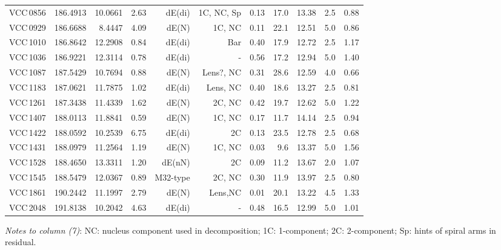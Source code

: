 \documentclass[useAMS,usenatbib]{mn2e}
\begin{document}
\begin{table*}
\begin{threeparttable}
\begin{tabular}{|r|r|r|r|r|r|r|r|r|r|r|}
VCC\,0856 &186.4913 & 10.0661 & 2.63  &dE(di)	  	&1C, NC, Sp	&0.13	&17.0	&13.38	&2.5& 0.88 	\\
VCC\,0929 &186.6688 & 8.4447  & 4.09  &dE(N)    	&1C, NC		&0.11	&22.1	&12.51	&5.0& 0.86 	\\
VCC\,1010 &186.8642 & 12.2908 & 0.84  &dE(di)	  	&Bar		&0.40	&17.9	&12.72	&2.5& 1.17	\\
VCC\,1036 &186.9221 & 12.3114 & 0.78  &dE(di)   	&-			&0.56	&17.2	&12.94	&5.0& 1.40	\\
VCC\,1087 &187.5429 & 10.7694 & 0.88  &dE(N)    	&Lens?, NC	&0.31	&28.6	&12.59	&4.0& 0.66	\\
VCC\,1183 &187.0621 & 11.7875 & 1.02  &dE(di)	  	&Lens, NC	&0.40	&18.6	&13.27	&2.5& 0.81	\\
VCC\,1261 &187.3438 & 11.4339 & 1.62  &dE(N)    	&2C, NC		&0.42	&19.7	&12.62	&5.0& 1.22	\\
VCC\,1407 &188.0113 & 11.8841 & 0.59  &dE(N)	  	&1C, NC		&0.17	&11.7	&14.14	&2.5& 0.94	\\
VCC\,1422 &188.0592 & 10.2539 & 6.75  &dE(di)	  	&2C			&0.13	&23.5	&12.78	&2.5& 0.68	\\
VCC\,1431 &188.0979 & 11.2564 & 1.19  &dE(N)    	&1C, NC		&0.03	& 9.6	&13.37	&5.0& 1.56	\\
VCC\,1528 &188.4650 & 13.3311 & 1.20  &dE(nN)	  	&2C			&0.09	&11.2	&13.67	&2.0& 1.07	\\
VCC\,1545 &188.5479 & 12.0367 & 0.89  &M32-type 	&2C, NC		&0.30	&11.9	&13.97	&2.5& 0.80	\\
VCC\,1861 &190.2442 & 11.1997 & 2.79  &dE(N)    	&Lens,NC	&0.01	&20.1	&13.22	&4.5& 1.33	\\
VCC\,2048 &191.8138 & 10.2042 & 4.63  &dE(di)   	&-			&0.48	&16.5	&12.99	&5.0& 1.01	\\
\hline
\end{tabular}
\label{observations} 
\textit{Notes to column (7)}: NC: nucleus component used in decomposition; 1C: 1-component; 2C: 2-component; Sp: hints of spiral arms in residual.
\end{threeparttable}
\end{table*}
\end{document}
